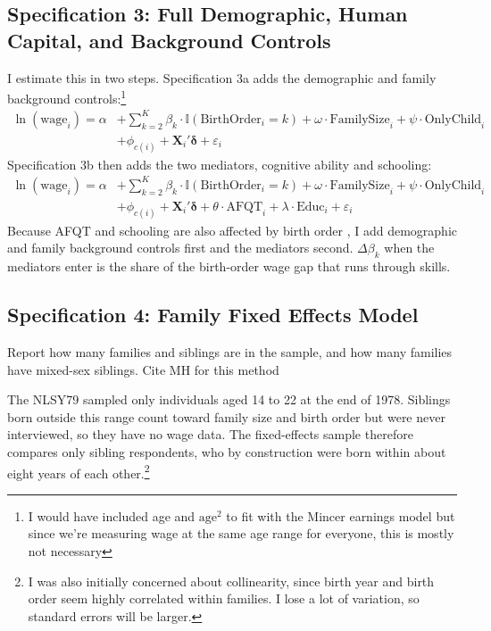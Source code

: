 \documentclass[12pt]{article}
\begin{document}
\subsection*{Specification 3: Full Demographic, Human Capital, and Background Controls}
I estimate this in two steps. Specification 3a adds the demographic and family background controls:\footnote{I would have included age and $\text{age}^2$ to fit with the Mincer earnings model \citep{mincer74} but since we're measuring wage at the same age range for everyone, this is mostly not necessary} 
\begin{equation}
\begin{split}
\ln(\text{wage}_{i}) = \alpha &+ \sum_{k=2}^{K} \beta_k \cdot \mathbb{I}(\text{BirthOrder}_i = k) + \omega \cdot \text{FamilySize}_i + \psi \cdot \text{OnlyChild}_i \\
&+ \phi_{c(i)} + \mathbf{X}_{i}'\boldsymbol{\delta} + \varepsilon_{i}
\end{split}
\label{eq:spec3a}
\end{equation}
Specification 3b then adds the two mediators, cognitive ability and schooling:
\begin{equation}
\begin{split}
\ln(\text{wage}_{i}) = \alpha &+ \sum_{k=2}^{K} \beta_k \cdot \mathbb{I}(\text{BirthOrder}_i = k) + \omega \cdot \text{FamilySize}_i + \psi \cdot \text{OnlyChild}_i \\
&+ \phi_{c(i)} + \mathbf{X}_{i}'\boldsymbol{\delta} + \theta \cdot \text{AFQT}_i + \lambda \cdot \text{Educ}_i + \varepsilon_{i}
\end{split}
\label{eq:spec3b}
\end{equation}
Because AFQT and schooling are also affected by birth order \citep{black17}, I add demographic and family background controls first and the mediators second. $\Delta\beta_k$ when the mediators enter is the share of the birth-order wage gap that runs through skills.

\subsection*{Specification 4: Family Fixed Effects Model}
Report how many families and siblings are in the sample, and how many families have mixed-sex siblings. Cite MH for this method

The NLSY79 sampled only individuals aged 14 to 22 at the end of 1978. Siblings born outside this range count toward family size and birth order but were never interviewed, so they have no wage data. The fixed-effects sample therefore compares only sibling respondents, who by construction were born within about eight years of each other.\footnote{I was also initially concerned about collinearity, since birth year and birth order seem highly correlated within families. I lose a lot of variation, so standard errors will be larger.}
\end{document}
